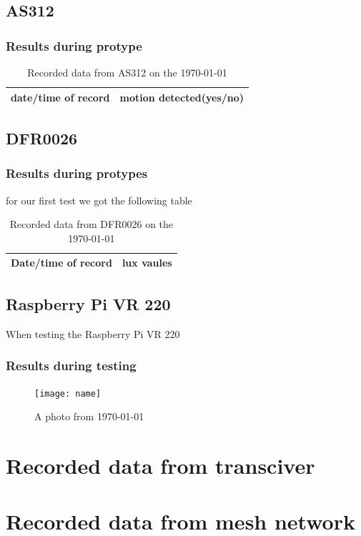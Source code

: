 \subsection{AS312}
\subsubsection{Results during protype}
\begin{table}[h!]
    \centering
    \begin{tabular}{|c|c|}
        \hline
        date/time of record & motion detected(yes/no)\\
        \hline \hline
    \end{tabular}
    \caption{Recorded data from  AS312 on the \today}
    \label{Recorded data from  AS312 on the \today}
\end{table}
\subsection{DFR0026}
\subsubsection{Results during protypes}
for our first test we got  the following  table 
\begin{table}[h!]
    \centering
    \begin{tabular}{|c|c|}
        \hline
        Date/time of record & lux vaules\\
        \hline \hline
    \end{tabular}
    \caption{Recorded data from DFR0026 on the \today}
    \label{Recorded data from DFR0026 on the \today}
\end{table}
\subsection{Raspberry Pi VR 220}
When testing  the Raspberry Pi VR 220
\subsubsection{Results during testing}
\begin{figure}
    \centering
    \texttt{[image: name]}
    \caption{A photo from \today }
    \label{A photo from \today}
\end{figure}

\section{Recorded data from transciver}
\section{Recorded data from mesh network}